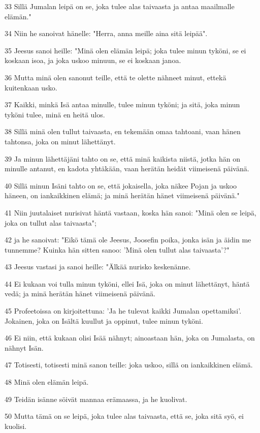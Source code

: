\par 33 Sillä Jumalan leipä on se, joka tulee alas taivaasta ja antaa maailmalle elämän."
\par 34 Niin he sanoivat hänelle: "Herra, anna meille aina sitä leipää".
\par 35 Jeesus sanoi heille: "Minä olen elämän leipä; joka tulee minun tyköni, se ei koskaan isoa, ja joka uskoo minuun, se ei koskaan janoa.
\par 36 Mutta minä olen sanonut teille, että te olette nähneet minut, ettekä kuitenkaan usko.
\par 37 Kaikki, minkä Isä antaa minulle, tulee minun tyköni; ja sitä, joka minun tyköni tulee, minä en heitä ulos.
\par 38 Sillä minä olen tullut taivaasta, en tekemään omaa tahtoani, vaan hänen tahtonsa, joka on minut lähettänyt.
\par 39 Ja minun lähettäjäni tahto on se, että minä kaikista niistä, jotka hän on minulle antanut, en kadota yhtäkään, vaan herätän heidät viimeisenä päivänä.
\par 40 Sillä minun Isäni tahto on se, että jokaisella, joka näkee Pojan ja uskoo häneen, on iankaikkinen elämä; ja minä herätän hänet viimeisenä päivänä."
\par 41 Niin juutalaiset nurisivat häntä vastaan, koska hän sanoi: "Minä olen se leipä, joka on tullut alas taivaasta";
\par 42 ja he sanoivat: "Eikö tämä ole Jeesus, Joosefin poika, jonka isän ja äidin me tunnemme? Kuinka hän sitten sanoo: 'Minä olen tullut alas taivaasta'?"
\par 43 Jeesus vastasi ja sanoi heille: "Älkää nurisko keskenänne.
\par 44 Ei kukaan voi tulla minun tyköni, ellei Isä, joka on minut lähettänyt, häntä vedä; ja minä herätän hänet viimeisenä päivänä.
\par 45 Profeetoissa on kirjoitettuna: 'Ja he tulevat kaikki Jumalan opettamiksi'. Jokainen, joka on Isältä kuullut ja oppinut, tulee minun tyköni.
\par 46 Ei niin, että kukaan olisi Isää nähnyt; ainoastaan hän, joka on Jumalasta, on nähnyt Isän.
\par 47 Totisesti, totisesti minä sanon teille: joka uskoo, sillä on iankaikkinen elämä.
\par 48 Minä olen elämän leipä.
\par 49 Teidän isänne söivät mannaa erämaassa, ja he kuolivat.
\par 50 Mutta tämä on se leipä, joka tulee alas taivaasta, että se, joka sitä syö, ei kuolisi.
